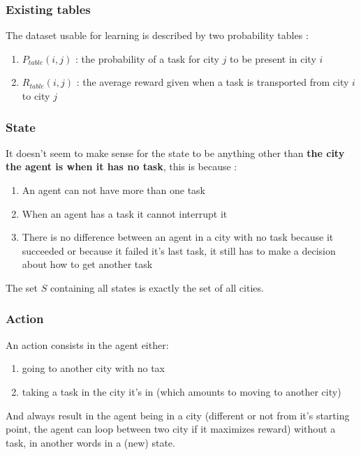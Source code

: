 \documentclass[11pt]{article}
\begin{document}
\subsubsection{Existing tables}

The dataset usable for learning is described by two probability tables :

\begin{enumerate}
    \item $P_{table}(i,j)$ : the probability of a task for city $j$ to be present in city $i$
    \item $R_{table}(i,j)$ : the average reward given when a task is transported from city $i$ to city $j$
\end{enumerate}

\subsubsection{State} 
It doesn't seem to make sense for the state to be anything other than \textbf{the city the agent is when it has no task}, this is because :
\begin{enumerate}
    \item An agent can not have more than one task
    \item When an agent has a task it cannot interrupt it
    \item There is no difference between an agent in a city with no task because it succeeded or because it failed it's last task, it still has to make a decision about how to get another task
\end{enumerate}

The set $S$ containing all states is exactly the set of all cities.

\subsubsection{Action}
An action consists in the agent either:
\begin{enumerate}
    \item going to another city with no tax
    \item taking a task in the city it's in (which amounts to moving to another city)
\end{enumerate}
And always result in the agent being in a city (different or not from it's starting point, the agent can loop between two city if it maximizes reward) without a task, in another words in a (new) state. \\
\end{document}
